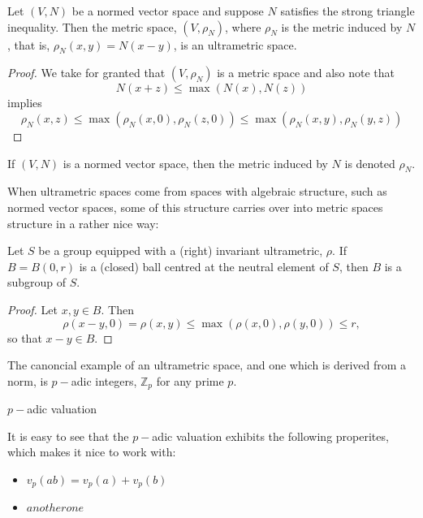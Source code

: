 \begin{proposition}
	Let $(V,N)$ be a normed vector space and suppose $N$ satisfies the strong triangle inequality. Then the metric space, $(V,\rho_N)$, where $\rho_N$ is the metric induced by $N$, that is, $\rho_N(x,y) = N(x-y)$, is an ultrametric space.
\end{proposition}

\begin{proof}
We take for granted that  $(V,\rho_N)$ is a metric space and also note that 
\[N(x + z) \leq \max(N(x), N(z))\]
 implies  
\[\rho_N(x,z) \leq \max(\rho_N(x,0), \rho_N(z,0)) \leq \max(\rho_N(x,y), \rho_N(y,z))\]
\end{proof}

\begin{notation*}
 If $(V, N)$ is a normed vector space, then the metric induced by $N$ is denoted $\rho_N$.
\end{notation*}

When ultrametric spaces come from spaces with algebraic structure, such as normed vector spaces, some of this structure carries over into metric spaces structure in a rather nice way:\\

\begin{proposition}
\cite{ar} Let $S$ be a  group equipped with a (right) invariant ultrametric, $\rho$. If $B=B(0,r)$ is a (closed) ball centred at the neutral element of $S$, then $B$ is a subgroup of $S$.
\end{proposition}

\begin{proof}
Let $x,y \in B$. Then \[\rho(x-y,0) = \rho(x,y)  \leq \max(\rho(x,0), \rho(y,0)) \leq r,\]
so that $x-y \in B$.
\end{proof}

The canoncial example of an ultrametric space, and one which is derived from a norm, is $p-$adic integers, $\mathbb{Z}_p$ for any prime $p$. 
\begin{definition}
$p-$adic valuation
\end{definition}

It is easy to see that the $p-$adic valuation exhibits the following properites, which makes it nice to work with:

\begin{itemize}
\item $v_p(ab) = v_p(a) + v_p(b)$
\item $another one$
\end{itemize}

